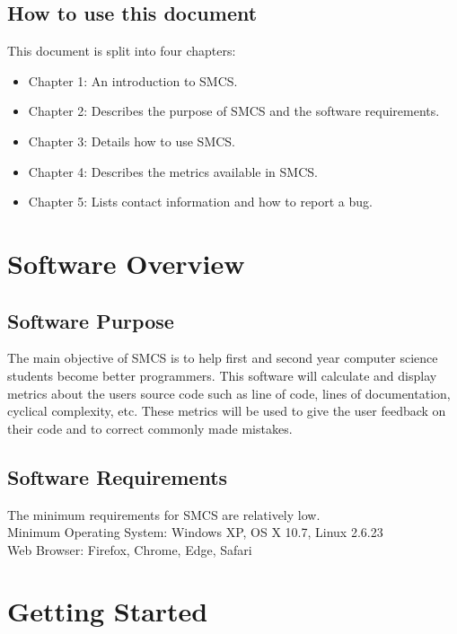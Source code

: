 \documentclass{scrreprt}
\begin{document}
	\section{How to use this document}
	This document is split into four chapters: 
	\begin{itemize}
		\item Chapter 1: An introduction to SMCS. 
		\item Chapter 2: Describes the purpose of SMCS and the software requirements. 
		\item Chapter 3: Details how to use SMCS. 
		\item Chapter 4: Describes the metrics available in SMCS. 
		\item Chapter 5: Lists contact information and how to report a bug.
	\end{itemize}
	
	{\let\clearpage\relax \chapter{Software Overview}}
	
	\section{Software Purpose}
	The main objective of SMCS is to help first and second year computer science students become better programmers.
	This software will calculate and display metrics about the users source code such as line of code, lines of documentation, cyclical complexity, etc.
	These metrics will be used to give the user feedback on their code and to correct commonly made mistakes.

	\section{Software Requirements}
	The minimum requirements for SMCS are relatively low.\\
	Minimum Operating System: Windows XP, OS X 10.7, Linux 2.6.23\\
	Web Browser: Firefox, Chrome, Edge, Safari\\

	{\let\clearpage\relax \chapter{Getting Started}}
\end{document}
